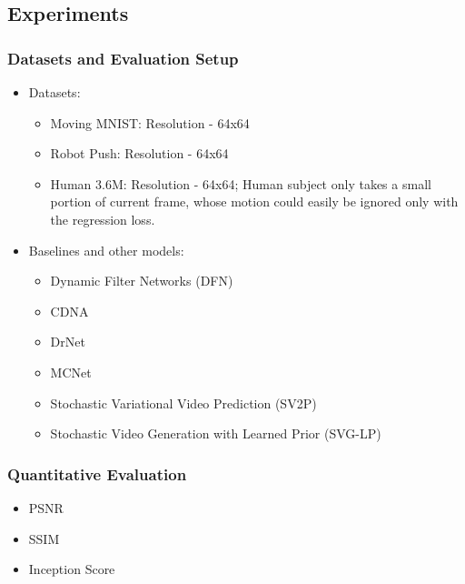 \documentclass{article}
\begin{document}
    \subsection{Experiments}\label{subsec:Video_Prediction_via_Selective_Sampling_(VPSS)_(2018_NIPS):experiments}

    \subsubsection{Datasets and Evaluation Setup}\label{subsubsec:Video_Prediction_via_Selective_Sampling_(VPSS)_(2018_NIPS):datasets-and-evaluation-setup}
    \begin{itemize}
        \item Datasets:
        \begin{itemize}
            \item Moving MNIST: Resolution - 64x64
            \item Robot Push: Resolution - 64x64
            \item Human 3.6M: Resolution - 64x64;
            Human subject only takes a small portion of current frame, whose motion could easily be ignored only with the regression loss.
        \end{itemize}
        \item Baselines and other models:
        \begin{itemize}
            \item Dynamic Filter Networks (DFN)
            \item CDNA
            \item DrNet
            \item MCNet
            \item Stochastic Variational Video Prediction (SV2P)
            \item Stochastic Video Generation with Learned Prior (SVG-LP)
        \end{itemize}
    \end{itemize}

    \subsubsection{Quantitative Evaluation}\label{subsubsec:Video_Prediction_via_Selective_Sampling_(VPSS)_(2018_NIPS):quantitative-evaluation}
    \begin{itemize}
        \item PSNR
        \item SSIM
        \item Inception Score
    \end{itemize}
\end{document}
